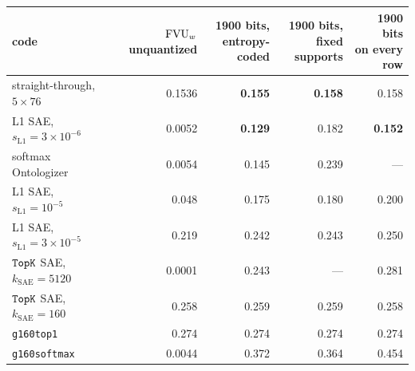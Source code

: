 \begin{center}\small\setlength{\tabcolsep}{4pt}
\begin{tabular}{@{}lrrrr@{}}
\toprule
code & \stackhead[r]{$\fvu$\\unquantized} & \stackhead[r]{1900 bits,\\entropy-coded} & \stackhead[r]{1900 bits,\\fixed supports} & \stackhead[r]{1900 bits\\on every row} \\
\midrule
straight-through, $5\times76$ & 0.1536 & \textbf{0.155} & \textbf{0.158} & 0.158 \\
L1 SAE, $s_{\mathrm{L1}}{=}3\times10^{-6}$ & 0.0052 & \textbf{0.129} & 0.182 & \textbf{0.152} \\
softmax Ontologizer & 0.0054 & 0.145 & 0.239 & --- \\
L1 SAE, $s_{\mathrm{L1}}{=}10^{-5}$ & 0.048 & 0.175 & 0.180 & 0.200 \\
L1 SAE, $s_{\mathrm{L1}}{=}3\times10^{-5}$ & 0.219 & 0.242 & 0.243 & 0.250 \\
$\mathop{\mathtt{TopK}}\limits$ SAE, $k_{\mathrm{SAE}}{=}5120$ & 0.0001 & 0.243 & --- & 0.281 \\
$\mathop{\mathtt{TopK}}\limits$ SAE, $k_{\mathrm{SAE}}{=}160$ & 0.258 & 0.259 & 0.259 & 0.258 \\
\texttt{g160top1} & 0.274 & 0.274 & 0.274 & 0.274 \\
\texttt{g160softmax} & 0.0044 & 0.372 & 0.364 & 0.454 \\
\bottomrule
\end{tabular}
\end{center}

